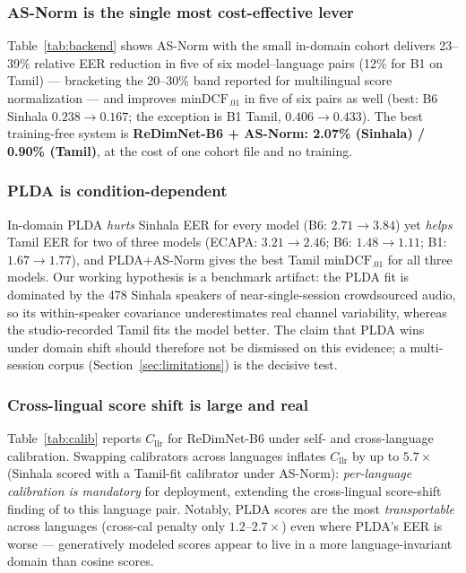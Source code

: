 \documentclass[journal]{IEEEtran}
\newcommand{\dcf}{\mathrm{minDCF}}
\newcommand{\cllr}{C_{\mathrm{llr}}}
\begin{document}
\subsubsection{AS-Norm is the single most cost-effective lever}
Table~\ref{tab:backend} shows AS-Norm with the small in-domain cohort
delivers 23--39\% relative EER reduction in five of six
model--language pairs (12\% for B1 on Tamil) --- bracketing the
20--30\% band reported for multilingual score normalization
\cite{matejka2017analysis} --- and improves $\dcf_{.01}$ in five of
six pairs as well (best: B6 Sinhala $0.238\to0.167$; the exception is
B1 Tamil, $0.406\to0.433$). The best training-free
system is \textbf{ReDimNet-B6 + AS-Norm: 2.07\% (Sinhala) / 0.90\%
(Tamil)}, at the cost of one cohort file and no training.

\subsubsection{PLDA is condition-dependent}
In-domain PLDA \emph{hurts} Sinhala EER for every model (B6:
$2.71\to3.84$) yet \emph{helps} Tamil EER for two of three models
(ECAPA: $3.21\to2.46$; B6: $1.48\to1.11$; B1: $1.67\to1.77$), and
PLDA+AS-Norm gives the best Tamil $\dcf_{.01}$ for all three models. Our working hypothesis is a benchmark
artifact: the PLDA fit is dominated by the 478 Sinhala speakers of
near-single-session crowdsourced audio, so its within-speaker
covariance underestimates real channel variability, whereas the
studio-recorded Tamil fits the model better. The claim that PLDA wins
under domain shift \cite{wang2022scoring} should therefore not be
dismissed on this evidence; a multi-session corpus
(Section~\ref{sec:limitations}) is the decisive test.

\subsubsection{Cross-lingual score shift is large and real}
Table~\ref{tab:calib} reports $\cllr$ for ReDimNet-B6 under self- and
cross-language calibration. Swapping calibrators across languages
inflates $\cllr$ by up to $5.7\times$ (Sinhala scored with a
Tamil-fit calibrator under AS-Norm): \emph{per-language calibration
is mandatory} for deployment, extending the cross-lingual score-shift
finding of \cite{thienpondt2022tackling} to this language pair.
Notably, PLDA scores are the most \emph{transportable} across
languages (cross-cal penalty only $1.2$--$2.7\times$) even where
PLDA's EER is worse --- generatively modeled scores appear to live in
a more language-invariant domain than cosine scores.
\end{document}
